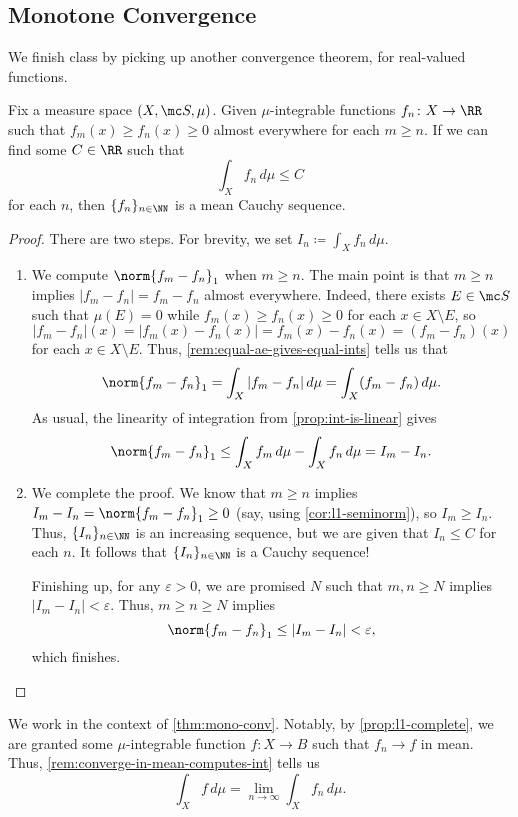 \documentclass[../notes.tex]{subfiles}
\begin{document}
\subsection{Monotone Convergence}
We finish class by picking up another convergence theorem, for real-valued functions.
\begin{theorem} \label{thm:mono-conv}
	Fix a measure space $(X,\mc S,\mu)$. Given $\mu$-integrable functions $f_n\colon X\to\RR$ such that $f_m(x)\ge f_n(x)\ge0$ almost everywhere for each $m\ge n$. If we can find some $C\in\RR$ such that
	\[\int_Xf_n\,d\mu\le C\]
	for each $n$, then $\{f_n\}_{n\in\NN}$ is a mean Cauchy sequence.
\end{theorem}
\begin{proof}
	There are two steps. For brevity, we set $I_n\coloneqq\int_Xf_n\,d\mu$.
	\begin{enumerate}
		\item We compute $\norm{f_m-f_n}_1$ when $m\ge n$. The main point is that $m\ge n$ implies $|f_m-f_n|=f_m-f_n$ almost everywhere. Indeed, there exists $E\in\mc S$ such that $\mu(E)=0$ while $f_m(x)\ge f_n(x)\ge0$ for each $x\in X\setminus E$, so
		\[|f_m-f_n|(x)=|f_m(x)-f_n(x)|=f_m(x)-f_n(x)=(f_m-f_n)(x)\]
		for each $x\in X\setminus E$. Thus, \autoref{rem:equal-ae-gives-equal-ints} tells us that
		\[\norm{f_m-f_n}_1=\int_X|f_m-f_n|\,d\mu=\int_X(f_m-f_n)\,d\mu.\]
		As usual, the linearity of integration from \autoref{prop:int-is-linear} gives
		\[\norm{f_m-f_n}_1\le\int_Xf_m\,d\mu-\int_Xf_n\,d\mu=I_m-I_n.\]

		\item We complete the proof. We know that $m\ge n$ implies $I_m-I_n=\norm{f_m-f_n}_1\ge0$ (say, using \autoref{cor:l1-seminorm}), so $I_m\ge I_n$. Thus, $\{I_n\}_{n\in\NN}$ is an increasing sequence, but we are given that $I_n\le C$ for each $n$. It follows that $\{I_n\}_{n\in\NN}$ is a Cauchy sequence!

		Finishing up, for any $\varepsilon>0$, we are promised $N$ such that $m,n\ge N$ implies $|I_m-I_n|<\varepsilon$. Thus, $m\ge n\ge N$ implies
		\[\norm{f_m-f_n}_1\le|I_m-I_n|<\varepsilon,\]
		which finishes.
		\qedhere
	\end{enumerate}
\end{proof}
\begin{remark}
	We work in the context of \autoref{thm:mono-conv}. Notably, by \autoref{prop:l1-complete}, we are granted some $\mu$-integrable function $f\colon X\to B$ such that $f_n\to f$ in mean. Thus, \autoref{rem:converge-in-mean-computes-int} tells us
	\[\int_Xf\,d\mu=\lim_{n\to\infty}\int_Xf_n\,d\mu.\]
\end{remark}
\end{document}
